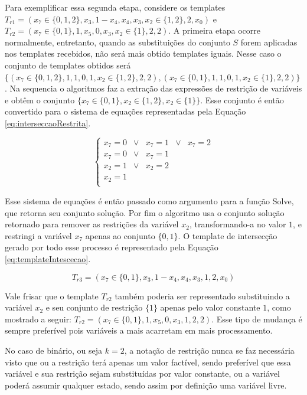 \documentclass[12pt,a4paper]{article}
\begin{document}
	Para exemplificar essa segunda etapa, considere os templates $T_{r1} = (x_7 \in \{0,1,2\},x_3,1-x_4,x_4,x_3,x_2 \in \{1,2\},2,x_0)$ e $T_{r2} = (x_7 \in \{0,1\},1,x_5,0,x_3,x_2 \in \{1\},2,2)$. A primeira etapa ocorre normalmente, entretanto, quando as substituições do conjunto $S$ forem aplicadas nos templates recebidos, não será mais obtido templates iguais. Nesse caso o conjunto de templates obtidos será $\{(x_7 \in \{0,1,2\}, 1, 1, 0, 1, x_2 \in \{1,2\}, 2, 2), (x_7 \in \{0,1\}, 1, 1, 0, 1, x_2 \in \{1\}, 2, 2)\}$. Na sequencia o algoritmos faz a extração das expressões de restrição de variáveis e obtêm o conjunto $\{x_7 \in \{0,1\}, x_2 \in \{1,2\}, x_2 \in \{1\} \}$. Esse conjunto é então convertido para o sistema de equações representadas pela Equação \ref{eq:interseccaoRestrita}.

	\begin{equation}
	\left\{\begin{matrix}
	x_7	  = 0 	& \vee &	x_7	=	1 & \vee &	x_7	= 2	\\ 
	x_7   = 0 	& \vee &	x_7	=	1					\\ 
	x_2   = 1 	& \vee &	x_2	=	2					\\ 
	x_2	  =	1											\\ 
	\end{matrix}\right.
	\label{eq:interseccaoRestrita}
	\end{equation}

	Esse sistema de equações é então passado como argumento para a função Solve, que retorna seu conjunto solução. Por fim o algoritmo usa o conjunto solução retornado para remover as restrições da variável $x_2$, transformando-a no valor $1$, e restringi a variável $x_7$ apenas ao conjunto $\{0,1\}$. O template de intersecção gerado por todo esse processo é representado pela Equação \ref{eq:templateIntescecao}.

	\begin{equation}
	T_{r3} = (x_7 \in \{0,1\}, x_3, 1-x_4, x_4, x_3, 1, 2, x_0)
	\label{eq:templateIntescecao}
	\end{equation}

	Vale frisar que o template $T_{r2}$ também poderia ser representado substituindo a variável $x_2$ e seu conjunto de restrição $\{1\}$ apenas pelo valor constante $1$, como mostrado a seguir: $T_{r2} = (x_7 \in \{0,1\}, 1, x_5, 0, x_3, 1, 2, 2)$. Esse tipo de mudança é sempre preferível pois variáveis a mais acarretam em mais processamento.

	No caso de binário, ou seja $k = 2$, a notação de restrição nunca se faz necessária visto que ou a restrição terá apenas um valor factível, sendo preferível que essa variável e sua restrição sejam substituídas por valor constante, ou a variável poderá assumir qualquer estado, sendo assim por definição uma variável livre.
\end{document}

